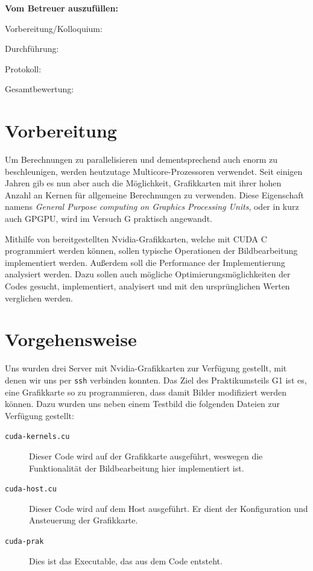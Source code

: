 \documentclass[12pt,a4paper]{scrartcl}
\begin{document}
\vspace*{0.3cm}
\textbf{Vom Betreuer auszuf\"ullen:}

Vorbereitung/Kolloquium:

Durchf\"uhrung:

Protokoll:

Gesamtbewertung:
\clearpage



\section{Vorbereitung}
Um Berechnungen zu parallelisieren und dementsprechend auch enorm zu beschleunigen, werden heutzutage Multicore-Prozessoren verwendet.
Seit einigen Jahren gib es nun aber auch die M\"oglichkeit, Grafikkarten mit ihrer hohen Anzahl an Kernen f\"ur allgemeine Berechnungen zu verwenden.
Diese Eigenschaft namens \textit{General Purpose computing on Graphics Processing Units}, oder in kurz auch GPGPU, wird im Versuch G praktisch angewandt.

Mithilfe von bereitgestellten Nvidia-Grafikkarten, welche mit CUDA C programmiert werden k\"onnen, sollen typische Operationen der Bildbearbeitung implementiert werden.
Au\ss erdem soll die Performance der Implementierung analysiert werden.
Dazu sollen auch m\"ogliche Optimierungsm\"oglichkeiten der Codes gesucht, implementiert, analyisert und mit den urspr\"unglichen Werten verglichen werden.


\section{Vorgehensweise}
Uns wurden drei Server mit Nvidia-Grafikkarten zur Verf\"ugung gestellt, mit denen wir uns per \texttt{ssh} verbinden konnten.
Das Ziel des Praktikumsteils G1 ist es, eine Grafikkarte so zu programmieren, dass damit Bilder modifiziert werden k\"onnen.
Dazu wurden uns neben einem Testbild die folgenden Dateien zur Verf\"ugung gestellt:

\begin{description}
    \item [\texttt{cuda-kernels.cu}] Dieser Code wird auf der Grafikkarte ausgef\"uhrt, weswegen die Funktionalit\"at der Bildbearbeitung hier implementiert ist.
    \item [\texttt{cuda-host.cu}] Dieser Code wird auf dem Host ausgef\"uhrt. Er dient der Konfiguration und Ansteuerung der Grafikkarte.
    \item [\texttt{cuda-prak}] Dies ist das Executable, das aus dem Code entsteht.
\end{description}
\end{document}
